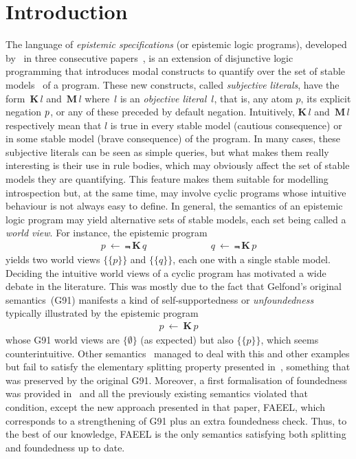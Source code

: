 \documentclass{new_tlp}
\def\K{\mathbf{K}\, }
\def\M{\mathbf{M}\, }
\let\sneg\relax
\newcommand{\sneg}{\ensuremath{\text{-}}}
\begin{document}
\section{Introduction}
\label{sec:intro}

The language of \emph{epistemic specifications}  (or epistemic logic programs), developed by~ in three consecutive papers~\cite{gelfond91a,GelfondP93,gelfond94},
is an extension of disjunctive logic programming that introduces modal constructs to quantify over the set of stable models~\cite{gellif88b} of a program.
%
These new constructs, called \emph{subjective literals}, have the form~$\K l$ and~$\M l$ where~$l$ is an \emph{objective literal}~$l$, that is, any atom $p$, its explicit negation $\sneg p$, or any of these preceded by default negation.
%
Intuitively, $\K l$ and~$\M l$ respectively mean that $l$ is true in every stable model (cautious consequence) or in some stable model (brave consequence) of the program.
%
In many cases, these subjective literals can be seen as simple queries, but what makes them really interesting is their use in rule bodies,
which may obviously affect the set of stable models they are quantifying.
%
This feature makes them suitable for modelling introspection but, at the same time, may involve cyclic programs whose intuitive behaviour is not always easy to define.
%
In general, the semantics of an epistemic logic program may yield alternative sets of stable models, each set being called a \emph{world view}.
%
For instance, the epistemic program
\begin{eqnarray}
p \ \leftarrow \ \Not \, \K q \hspace{80pt}
q \ \leftarrow \ \Not \, \K p  \label{f:epiloop}
\end{eqnarray}
%
yields two world views $\{\{p\}\}$ and $\{\{q\}\}$, each one with a single stable model.
%
Deciding the intuitive world views of a cyclic program has motivated a wide debate in the literature.
%
This was mostly due to the fact that Gelfond's original \mbox{semantics (G91)} manifests a kind of self-supportedness or \emph{unfoundedness} typically illustrated by the epistemic program
\begin{eqnarray}
p \ \leftarrow \ \K p \label{f:selfsupport}
\end{eqnarray}
whose G91 world views are $\{\emptyset\}$ (as expected) but also $\{\{p\}\}$, which seems counterintuitive.
%
Other semantics~\cite{kawabagezh15,faheir15a,sheeit17a} managed to deal with this and other examples but fail to satisfy the elementary splitting property presented in~\cite{cafafa19a}, something that was preserved by the original G91.
%
Moreover, a first formalisation of foundedness was provided in~\cite{cafafa19b} and all the previously existing semantics violated that condition, except the new approach presented in that paper, FAEEL, which corresponds to a strengthening of G91 plus an extra foundedness check.
%
Thus, to the best of our knowledge, FAEEL is the only semantics satisfying both splitting and foundedness up to date.
\end{document}

